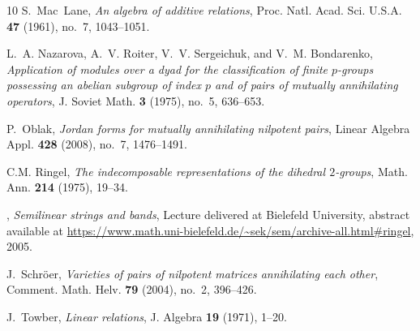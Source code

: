 \documentclass[12pt]{amsart}
\theoremstyle{definition}
\newcommand{\<}{\langle}   %
\renewcommand{\>}{\rangle} %
\begin{document}
\begin{thebibliography}{10}
S.~Mac~Lane, \emph{{{An algebra of additive relations}}}, Proc. Natl. Acad. Sci. U.S.A. \textbf{47} (1961), no.~7, 1043--1051.

L.~A. Nazarova, A.~V. Roiter, V.~V. Sergeichuk, and V.~M. Bondarenko, \emph{Application of modules over a dyad for the classification of finite {{$p$-groups}} possessing an abelian subgroup of index $p$ and of pairs of mutually annihilating operators}, J. Soviet Math. \textbf{3} (1975), no.~5, 636--653.

P.~Oblak, \emph{Jordan forms for mutually annihilating nilpotent pairs}, Linear Algebra Appl. \textbf{428} (2008), no.~7, 1476--1491.

C.M. Ringel, \emph{The indecomposable representations of the dihedral {$2$}-groups}, Math. Ann. \textbf{214} (1975), 19--34. 

\bysame, \emph{Semilinear strings and bands}, Lecture delivered at Bielefeld University, abstract available at \url{https://www.math.uni-bielefeld.de/~sek/sem/archive-all.html#ringel}, 2005.

J.~Schr{\"o}er, \emph{Varieties of pairs of nilpotent matrices annihilating each other}, Comment. Math. Helv. \textbf{79} (2004), no.~2, 396--426.

J.~Towber, \emph{Linear relations}, J. Algebra \textbf{19} (1971), 1--20. 

\end{thebibliography}
\end{document}
